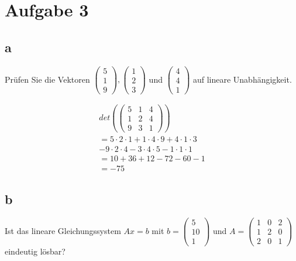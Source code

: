 \section{Aufgabe 3}

\subsection{a}
Prüfen Sie die Vektoren $\begin{pmatrix}5 \\ 1 \\ 9\end{pmatrix}, \begin{pmatrix}1 \\2 \\ 3\end{pmatrix}$ und $\begin{pmatrix}4 \\ 4 \\ 1\end{pmatrix}$ auf lineare Unabhängigkeit.

\begin{align*}
    det\left(\begin{pmatrix}
                 5 & 1 & 4 \\
                 1 & 2 & 4 \\
                 9 & 3 & 1
             \end{pmatrix}\right)                               \\
    =5 \cdot 2 \cdot 1 + 1 \cdot 4 \cdot 9 + 4 \cdot 1 \cdot 3  \\
    - 9 \cdot 2 \cdot 4 - 3 \cdot 4 \cdot 5 - 1 \cdot 1 \cdot 1 \\
    = 10 + 36 + 12 - 72 - 60 - 1                                \\
    = -75
\end{align*}

\subsection{b}
Ist das lineare Gleichungssystem $Ax = b$ mit $b = \begin{pmatrix}5 \\ 10 \\ 1\end{pmatrix}$ und $A = \begin{pmatrix}1 & 0 & 2 \\ 1 & 2 & 0 \\ 2 & 0 & 1\end{pmatrix}$ eindeutig lösbar?


